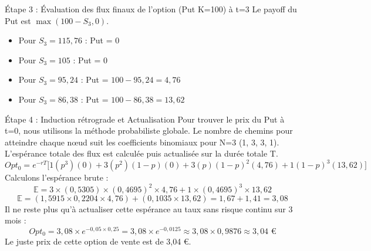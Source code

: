 \begin{examplebox}
Étape 3 : Évaluation des flux finaux de l'option (Put K=100) à t=3
Le payoff du Put est $\max(100 - S_3, 0)$.
\begin{itemize}[label=$\cdot$]
    \item Pour $S_3 = 115,76$ : Put = 0
    \item Pour $S_3 = 105$ : Put = 0
    \item Pour $S_3 = 95,24$ : Put = $100 - 95,24 = 4,76$
    \item Pour $S_3 = 86,38$ : Put = $100 - 86,38 = 13,62$
\end{itemize}

Étape 4 : Induction rétrograde et Actualisation
Pour trouver le prix du Put à t=0, nous utilisons la méthode probabiliste globale. Le nombre de chemins pour atteindre chaque nœud suit les coefficients binomiaux pour N=3 (1, 3, 3, 1). L'espérance totale des flux est calculée puis actualisée sur la durée totale T.
\begin{equation*}
    Opt_0 = e^{-rT} \Big[ 1(p^3)(0) + 3(p^2)(1-p)(0) + 3(p)(1-p)^2(4,76) + 1(1-p)^3(13,62) \Big]
\end{equation*}
Calculons l'espérance brute :
\begin{equation*}
    \mathbb{E} = 3 \times (0,5305) \times (0,4695)^2 \times 4,76 + 1 \times (0,4695)^3 \times 13,62
\end{equation*}
\begin{equation*}
    \mathbb{E} = (1,5915 \times 0,2204 \times 4,76) + (0,1035 \times 13,62) = 1,67 + 1,41 = 3,08
\end{equation*}
Il ne reste plus qu'à actualiser cette espérance au taux sans risque continu sur 3 mois :
\begin{equation*}
    Opt_0 = 3,08 \times e^{-0,05 \times 0,25} = 3,08 \times e^{-0,0125} \approx 3,08 \times 0,9876 \approx 3,04 \text{ €}
\end{equation*}
Le juste prix de cette option de vente est de 3,04 €.
\end{examplebox}

